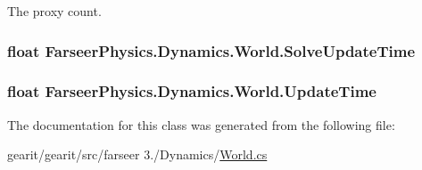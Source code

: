 The proxy count.\hypertarget{class_farseer_physics_1_1_dynamics_1_1_world_af8b17d134fbadec351d2cd1d73917908}{
\subsubsection[{Solve\+Update\+Time}]{\setlength{\rightskip}{0pt plus 5cm}float Farseer\+Physics.\+Dynamics.\+World.\+Solve\+Update\+Time\hspace{0.3cm}{\ttfamily [get]}}}\label{class_farseer_physics_1_1_dynamics_1_1_world_af8b17d134fbadec351d2cd1d73917908}
\hypertarget{class_farseer_physics_1_1_dynamics_1_1_world_a48a6ab5b43a81669bdd031b0002b68e0}{
\subsubsection[{Update\+Time}]{\setlength{\rightskip}{0pt plus 5cm}float Farseer\+Physics.\+Dynamics.\+World.\+Update\+Time\hspace{0.3cm}{\ttfamily [get]}}}\label{class_farseer_physics_1_1_dynamics_1_1_world_a48a6ab5b43a81669bdd031b0002b68e0}


The documentation for this class was generated from the following file\+:\begin{DoxyCompactItemize}
\item 
gearit/gearit/src/farseer 3./\+Dynamics/\hyperlink{_world_8cs}{World.\+cs}\end{DoxyCompactItemize}

